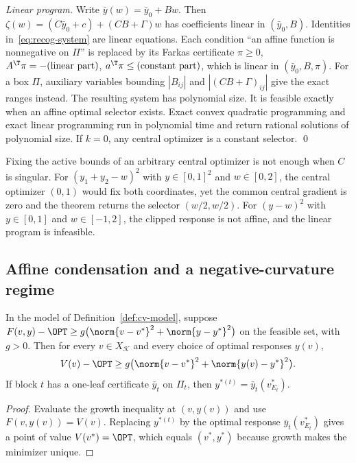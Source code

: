 \emph{Linear program.} Write $\bar y(w)=\bar y_0+Bw$. Then
$\zeta(w)=(C\bar y_0+c)+(CB+\Gamma)w$ has coefficients linear in
$(\bar y_0,B)$. Identities in~\eqref{eq:recog-system} are linear equations.
Each condition ``an affine function is nonnegative on $\Pi$'' is replaced by
its Farkas certificate $\pi\ge0$, $A^{\T}\pi=-(\text{linear part})$,
$a^{\T}\pi\le(\text{constant part})$, which is linear in $(\bar y_0,B,\pi)$.
For a box $\Pi$, auxiliary variables bounding $|B_{ij}|$ and
$|(CB+\Gamma)_{ij}|$ give the exact ranges instead. The resulting system has
polynomial size. It is feasible exactly when an affine optimal selector
exists. Exact convex quadratic programming \cite{KozlovTarasovKhachiyan1980}
and exact linear programming \cite{GrotschelLovaszSchrijver1988} run in
polynomial time and return rational solutions of polynomial size. If $k=0$,
any central optimizer is a constant selector. \qed

\medskip
Fixing the active bounds of an arbitrary central optimizer is not enough
when $C$ is singular. For $(y_1+y_2-w)^2$ with $y\in[0,1]^2$ and
$w\in[0,2]$, the central optimizer $(0,1)$ would fix both coordinates, yet
the common central gradient is zero and the theorem returns the selector
$(w/2,w/2)$. For $(y-w)^2$ with $y\in[0,1]$ and $w\in[-1,2]$, the clipped
response is not affine, and the linear program is infeasible.

\subsection{Affine condensation and a negative-curvature regime}

\begin{lemma}\label{lem:cv-growth}
In the model of Definition~\ref{def:cv-model}, suppose
$F(v,y)-\OPT\ge g\bigl(\norm{v-v^*}^2+\norm{y-y^*}^2\bigr)$ on the feasible
set, with $g>0$. Then for every $v\in X_{\mathcal K}$ and every choice of
optimal responses $y(v)$,
\[
V(v)-\OPT\ge g\bigl(\norm{v-v^*}^2+\norm{y(v)-y^*}^2\bigr).
\]
If block $t$ has a one-leaf certificate $\bar y_t$ on $\Pi_t$, then
$y^{*(t)}=\bar y_t(v^*_{E_t})$.
\end{lemma}

\begin{proof}
Evaluate the growth inequality at $(v,y(v))$ and use $F(v,y(v))=V(v)$.
Replacing $y^{*(t)}$ by the optimal response $\bar y_t(v^*_{E_t})$ gives a
point of value $V(v^*)=\OPT$, which equals $(v^*,y^*)$ because growth makes
the minimizer unique.
\end{proof}

